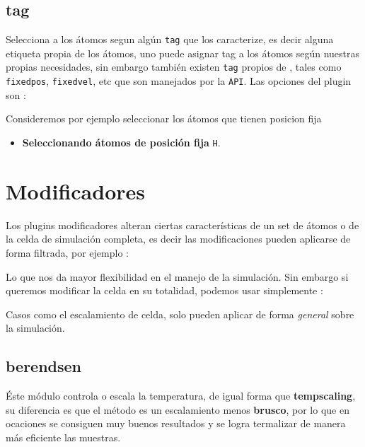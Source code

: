 \subsection{tag}
Selecciona a los \'atomos segun alg\'un \verb|tag| que los caracterize, es decir alguna etiqueta propia de los \'atomos, uno puede asignar tag a los \'atomos seg\'un nuestras propias necesidades, sin embargo tambi\'en existen \verb|tag| propios de {\lpmd}, tales como \verb|fixedpos|, \verb|fixedvel|, etc que son manejados por la \verb|API|. Las opciones del plugin son :


Consideremos por ejemplo seleccionar los \'atomos que tienen posicion fija

\begin{itemize}
 \item \textbf{Seleccionando \'atomos de posici\'on fija} \texttt{H}.
\end{itemize}

\section{Modificadores}

Los plugins modificadores alteran ciertas caracter\'isticas de un set de \'atomos o de la celda de simulaci\'on completa, es decir las modificaciones pueden aplicarse de forma filtrada, por ejemplo :


Lo que nos da mayor flexibilidad en el manejo de la simulaci\'on. Sin embargo si queremos modificar la celda en su totalidad, podemos usar simplemente :


Casos como el escalamiento de celda, solo pueden aplicar de forma \textit{general} sobre la simulaci\'on.

\subsection{berendsen}
\'Este m\'odulo controla o escala la temperatura, de igual forma que \textbf{tempscaling}, su diferencia es que el m\'etodo es un escalamiento menos \textbf{brusco}, por lo que en ocaciones se consiguen muy buenos resultados y se logra termalizar de manera m\'as eficiente las muestras. 

